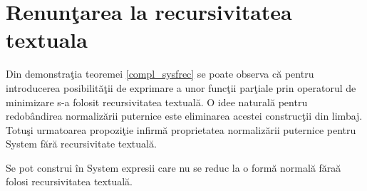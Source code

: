 \section{Renun\c tarea la recursivitatea textuala}

Din demonstra\c tia teoremei \ref{compl_sysfrec} se poate observa c\u a pentru introducerea posibilit\u a\c tii de exprimare a unor func\c tii par\c tiale prin operatorul de minimizare s-a folosit recursivitatea textual\u a. O idee natural\u a pentru redob\^ andirea normaliz\u arii puternice este eliminarea acestei construc\c tii din limbaj. Totu\c si urmatoarea propozi\c tie infirm\u a proprietatea normaliz\u arii puternice pentru System \frec f\u ar\u a recursivitate textual\u a.
\begin{proposition}\label{case_nonterm}
Se pot construi \^ in System \frec expresii care nu se reduc la o form\u a normal\u a f\u ara\u  a folosi recursivitatea textual\u a.
\end{proposition}
